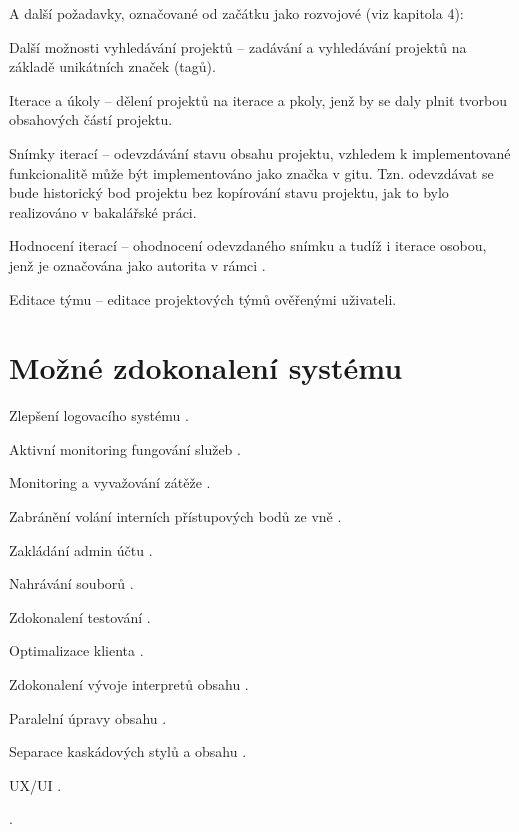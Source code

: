 A další požadavky, označované od začátku jako rozvojové (viz kapitola 4):


\begin{dl}
   \item[Další možnosti vyhledávání projektů] – zadávání a vyhledávání projektů na základě unikátních značek (tagů).
   \item[Iterace a úkoly] – dělení projektů na iterace a pkoly, jenž by se daly plnit tvorbou obsahových částí projektu.
   \item[Snímky iterací] – odevzdávání stavu obsahu projektu, vzhledem k implementované funkcionalitě může být implementováno jako značka v gitu.
   Tzn.
   odevzdávat se bude historický bod projektu bez kopírování stavu projektu, jak to bylo realizováno v bakalářské práci.
   \item[Hodnocení iterací] – ohodnocení odevzdaného snímku a tudíž i iterace osobou, jenž je označována jako autorita v rámci .
   \item[Editace týmu] – editace projektových týmů ověřenými uživateli.
\end{dl}



\section{Možné zdokonalení systému}\label{sec:improvements}


\begin{dl}
   \item[Zlepšení logovacího systému] .
   \item[Aktivní monitoring fungování služeb] .
   \item[Monitoring a vyvažování zátěže] .
   \item[Zabránění volání interních přístupových bodů ze vně] .
   \item[Zakládání admin účtu] .
   \item[Nahrávání souborů] .
   \item[Zdokonalení testování] .
   \item[Optimalizace klienta] .
   \item[Zdokonalení vývoje interpretů obsahu] .
   \item[Paralelní úpravy obsahu] .
   \item[Separace kaskádových stylů a obsahu] .
   \item[UX/UI] .
   \item[] .

\end{dl}
